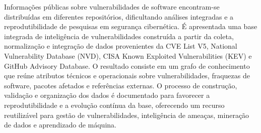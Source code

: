 \begin{abstract}
    Public vulnerability information is distributed across multiple repositories that differ in scope, structure, and update mechanisms, making integrated cybersecurity analyses difficult. An integrated vulnerability intelligence dataset is presented by collecting, normalizing, and correlating data from CVE List V5, the National Vulnerability Database (NVD), the CISA Known Exploited Vulnerabilities Catalog (KEV), and the GitHub Advisory Database. The resulting knowledge graph combines complementary technical and operational attributes describing vulnerabilities, software weaknesses, affected packages, and external references. The complete data construction workflow, quality assurance procedures, and storage model are documented to ensure reproducibility and support future extensions. The resulting resource provides a reusable foundation for vulnerability management, cyber threat intelligence, knowledge graph construction, and machine learning applications.
\end{abstract}

\begin{resumo}
    Informações públicas sobre vulnerabilidades de software encontram-se distribuídas em diferentes repositórios, dificultando análises integradas e a reprodutibilidade de pesquisas em segurança cibernética. É apresentada uma base integrada de inteligência de vulnerabilidades construída a partir da coleta, normalização e integração de dados provenientes da CVE List V5, National Vulnerability Database (NVD), CISA Known Exploited Vulnerabilities (KEV) e GitHub Advisory Database. O resultado consiste em um grafo de conhecimento que reúne atributos técnicos e operacionais sobre vulnerabilidades, fraquezas de software, pacotes afetados e referências externas. O processo de construção, validação e organização dos dados é documentado para favorecer a reprodutibilidade e a evolução contínua da base, oferecendo um recurso reutilizável para gestão de vulnerabilidades, inteligência de ameaças, mineração de dados e aprendizado de máquina.
\end{resumo}